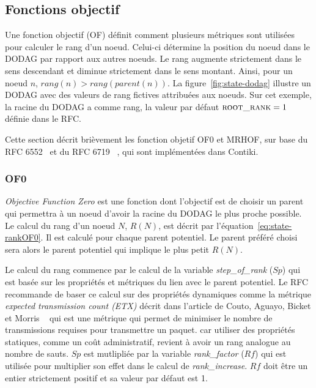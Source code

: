 \subsection*{Fonctions objectif}
Une fonction objectif (OF) définit comment plusieurs métriques sont utilisées pour calculer le rang d'un noeud. Celui-ci détermine la position du noeud dans le DODAG par rapport aux autres noeuds.
Le rang augmente strictement dans le sens descendant et diminue strictement dans le sens montant. Ainsi, pour un noeud $n$, $rang(n)>rang(parent(n))$. La figure~\ref{fig:state-dodag} illustre un DODAG avec des valeurs de rang fictives attribuées aux noeuds. Sur cet exemple, la racine du DODAG a comme rang, la valeur par défaut $\textsc{root\_rank}=1$ définie dans le RFC.

Cette section décrit brièvement les fonction objetif OF0 et MRHOF, sur base du RFC 6552~\cite{rfc:of0} et du RFC 6719 ~\cite{rfc:mrhof}, qui sont implémentées dans Contiki.

    \subsubsection*{OF0}
        \textit{Objective Function Zero} est une fonction dont l'objectif est de choisir un parent qui permettra à un noeud d'avoir la racine du DODAG le plus proche possible.
        Le calcul du rang d'un noeud $N$, $R(N)$, est décrit par l'équation~\ref{eq:state-rankOF0}. Il est calculé pour chaque parent potentiel. Le parent préféré choisi sera alors le parent potentiel qui implique le plus petit $R(N)$.\par


        Le calcul du rang commence par le calcul de la variable \textit{step\_of\_rank} ($Sp$) qui est 
        basée sur  les propriétés et métriques du lien avec le parent potentiel. Le RFC 
        recommande de baser ce calcul sur des propriétés dynamiques comme la métrique \textit{expected transmission count (ETX)} décrit dans l'article de Couto, Aguayo, Bicket et Morris
        ~\cite{paper:etx} qui est une métrique qui permet de minimiser le nombre de transmissions requises pour transmettre un paquet.
        car utiliser des propriétés statiques, comme un coût administratif, revient à avoir un
        rang analogue au nombre de sauts. $Sp$ est mutlipliée par la variable \textit{rank\_factor} ($Rf$) qui est utilisée pour multiplier son effet dans le calcul de
        \textit{rank\_increase}. $Rf$ doit être un entier strictement positif et sa valeur par défaut est 1.

